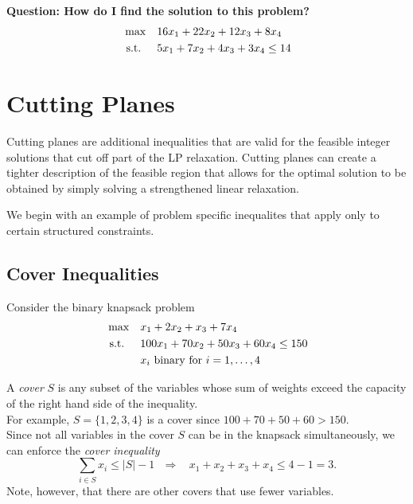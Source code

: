 \textbf{Question: How do I find the solution to this problem?}
%
%
%
%
\begin{align*}
\max \quad & 16x_1 + 22x_2 + 12x_3 + 8 x_4 \\
\mbox{ s.t. } \quad  & 5x_1 + 7x_2 + 4x_3 + 3x_4 \leq 14
\end{align*}
%
%
%
%
%

\section{Cutting Planes}
\label{sec:cutting-planes}
Cutting planes are additional inequalities that are valid for the feasible integer solutions that  cut off part of the LP relaxation.  Cutting planes can create a tighter description of the feasible region that allows for the optimal solution to be obtained by simply solving a strengthened linear relaxation. 

We begin with an example of problem specific inequalites that apply only to certain structured constraints.

\subsection{Cover Inequalities}
\label{subsec:cover-inequalities}
Consider the binary knapsack problem
\begin{align*}
\max \quad & x_1 + 2x_2 + x_3 + 7 x_4 \\
\mbox{ s.t. } \quad  & 100 x_1 + 70x_2 + 50 x_3 + 60 x_4 \leq 150 \\
& x_i  \mbox{ binary  for } i =1, \dots, 4
\end{align*}

A \emph{cover} $S$ is any subset of the variables whose sum of weights exceed the capacity of the right hand side of the inequality.\\
For example, $S = \{1,2,3,4\}$ is a cover since $100 + 70 + 50 + 60 > 150$.\\
Since not all variables in the cover $S$ can be in the knapsack simultaneously, we can enforce the \emph{cover inequality}
\begin{equation}
\sum_{i \in S} x_i \leq |S| - 1 \ \ \ \Rightarrow \ \ \ \ x_1 + x_2 + x_3 + x_4 \leq 4 - 1 = 3.
\end{equation}
Note, however, that there are other covers that use fewer variables.\\

